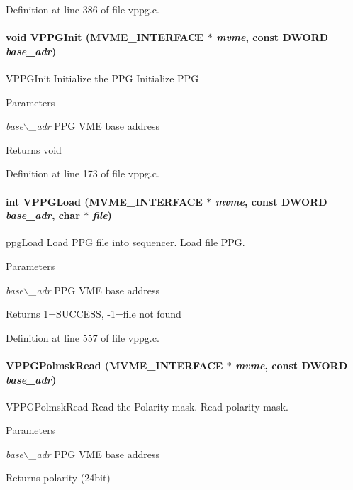Definition at line 386 of file vppg.c.
\paragraph[{VPPGInit}]{\setlength{\rightskip}{0pt plus 5cm}void VPPGInit ({\bf MVME\_\-INTERFACE} $\ast$ {\em mvme}, \/  const {\bf DWORD} {\em base\_\-adr})}\hfill\label{vppg_8h_a379092e6b2de168766f8773009f75f2b}
VPPGInit Initialize the PPG  Initialize PPG 
\begin{DoxyParams}{Parameters}
\item[{\em base$\backslash$\_\-adr}]PPG VME base address \end{DoxyParams}
\begin{DoxyReturn}{Returns}
void 
\end{DoxyReturn}


Definition at line 173 of file vppg.c.
\paragraph[{VPPGLoad}]{\setlength{\rightskip}{0pt plus 5cm}int VPPGLoad ({\bf MVME\_\-INTERFACE} $\ast$ {\em mvme}, \/  const {\bf DWORD} {\em base\_\-adr}, \/  char $\ast$ {\em file})}\hfill\label{vppg_8h_acd643aa3649bb10efabfdc28963ac52b}
ppgLoad Load PPG file into sequencer.  Load file PPG. 
\begin{DoxyParams}{Parameters}
\item[{\em base$\backslash$\_\-adr}]PPG VME base address \end{DoxyParams}
\begin{DoxyReturn}{Returns}
1=SUCCESS, -\/1=file not found 
\end{DoxyReturn}


Definition at line 557 of file vppg.c.
\paragraph[{VPPGPolmskRead}]{ VPPGPolmskRead ({\bf MVME\_\-INTERFACE} $\ast$ {\em mvme}, \/  const {\bf DWORD} {\em base\_\-adr})}\hfill\label{vppg_8h_afc374ec00602443b45c71d28043d7631}
VPPGPolmskRead Read the Polarity mask.  Read polarity mask. 
\begin{DoxyParams}{Parameters}
\item[{\em base$\backslash$\_\-adr}]PPG VME base address \end{DoxyParams}
\begin{DoxyReturn}{Returns}
polarity (24bit) 
\end{DoxyReturn}


